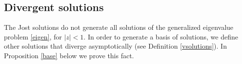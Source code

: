 \documentclass[12pt,oneside,onecolumn,open]{article}
\newtheorem{obs}[teo]{Remark}
\begin{document}



\subsection{Divergent solutions}

The  Jost solutions do not generate all solutions of the generalized eigenvalue problem \eqref{eigen}, for $|z |< 1$.  In order to generate a basis of solutions, we define other solutions that diverge asymptotically (see Definition \ref{vsolutions}). In Proposition \ref{base} below we prove this fact.     
\end{document}
